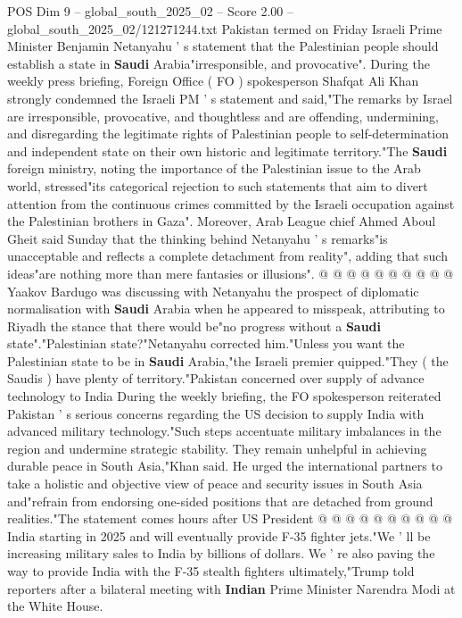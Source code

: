 \begin{textsample}{POS Dim 9 – global\_south\_2025\_02 – Score 2.00 – global\_south\_2025\_02/121271244.txt}  \label{ex:f9_pos_257}
Pakistan termed on Friday Israeli Prime Minister Benjamin Netanyahu ' s statement that the Palestinian people should establish a state in \textbf{Saudi} Arabia"irresponsible, and provocative".
During the weekly press briefing, Foreign Office ( FO ) spokesperson Shafqat Ali Khan strongly condemned the Israeli PM ' s statement and said,"The remarks by Israel are irresponsible, provocative, and thoughtless and are offending, undermining, and disregarding the legitimate rights of Palestinian people to self-determination and independent state on their own historic and legitimate territory."The \textbf{Saudi} foreign ministry, noting the importance of the Palestinian issue to the Arab world, stressed"its categorical rejection to such statements that aim to divert attention from the continuous crimes committed by the Israeli occupation against the Palestinian brothers in Gaza".
Moreover, Arab League chief Ahmed Aboul Gheit said Sunday that the thinking behind Netanyahu ' s remarks"is unacceptable and reflects a complete detachment from reality", adding that such ideas"are nothing more than mere fantasies or illusions". @ @ @ @ @ @ @ @ @ @ Yaakov Bardugo was discussing with Netanyahu the prospect of diplomatic normalisation with \textbf{Saudi} Arabia when he appeared to misspeak, attributing to Riyadh the stance that there would be"no progress without a \textbf{Saudi} state"."Palestinian state?"Netanyahu corrected him."Unless you want the Palestinian state to be in \textbf{Saudi} Arabia,"the Israeli premier quipped."They ( the Saudis ) have plenty of territory."Pakistan concerned over supply of advance technology to India During the weekly briefing, the FO spokesperson reiterated Pakistan ' s serious concerns regarding the US decision to supply India with advanced military technology."Such steps accentuate military imbalances in the region and undermine strategic stability.
They remain unhelpful in achieving durable peace in South Asia,"Khan said.
He urged the international partners to take a holistic and objective view of peace and security issues in South Asia and"refrain from endorsing one-sided positions that are detached from ground realities."The statement comes hours after US President @ @ @ @ @ @ @ @ @ @ India starting in 2025 and will eventually provide F-35 fighter jets."We ' ll be increasing military sales to India by billions of dollars.
We ' re also paving the way to provide India with the F-35 stealth fighters ultimately,"Trump told reporters after a bilateral meeting with \textbf{Indian} Prime Minister Narendra Modi at the White House.

\end{textsample}
